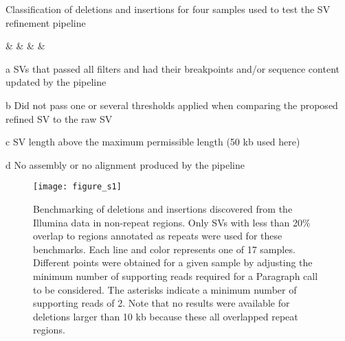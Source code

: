 \documentclass[12pt]{article}
\newenvironment{cfigure}
	{\begin{figure} \centering}
	{\end{figure}}
\begin{document}
\begin{table}
	\centering
	\caption{Classification of deletions and insertions for four samples used to test the SV refinement pipeline}
	\label{table_s4}

	\begin{threeparttable}\small

		{}%
		{\sample &  & \belowthr & \svlen & \noalignment}

		\begin{tablenotes}\footnotesize
		\item[a] SVs that passed all filters and had their breakpoints and/or sequence content updated by the pipeline
		\item[b] Did not pass one or several thresholds applied when comparing the proposed refined SV to the raw SV
		\item[c] SV length above the maximum permissible length (50 kb used here)
		\item[d] No assembly or no alignment produced by the pipeline
		\end{tablenotes}
	\end{threeparttable}

\end{table}

\clearpage%

\begin{cfigure}
	\texttt{[image: figure\_s1]}

	\caption[Illumina deletion and insertion benchmarks in non-repeat regions]{
		Benchmarking of deletions and insertions discovered from the Illumina data in non-repeat regions. 
		Only SVs with less than 20\% overlap to regions annotated as repeats were used for these benchmarks. 
		Each line and color represents one of 17 samples. 
		Different points were obtained for a given sample by adjusting the minimum number of supporting reads required for a Paragraph call to be considered. 
		The asterisks indicate a minimum number of supporting reads of 2.
		Note that no results were available for deletions larger than 10 kb because these all overlapped repeat regions.
	}

	\label{fig_s1}

\end{cfigure}
\end{document}
